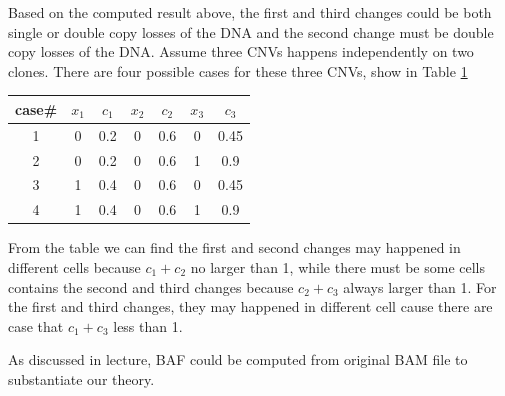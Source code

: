 \documentclass[a4paper]{article}
\begin{document}
Based on the computed result above, the first and third changes could be both single or double copy losses of the DNA and the second change must be double copy losses of the DNA. Assume three CNVs happens independently on two clones. There are four possible cases for these three CNVs, show in Table \ref{tb:1}

\begin{table}[h]
	\centering
	\begin{tabular}{c|cccccc}
		case\# & $x_1$ & $c_1$ & $x_2$ & $c_2$ & $x_3$ & $c_3$ \\
		\hline
		1 & 0 & 0.2 & 0 & 0.6 & 0 & 0.45 \\
		2 & 0 & 0.2 & 0 & 0.6 & 1 & 0.9 \\
		3 & 1 & 0.4 & 0 & 0.6 & 0 & 0.45 \\
		4 & 1 & 0.4 & 0 & 0.6 & 1 & 0.9 \\
	\end{tabular}
	\label{tb:1}
\end{table}

From the table we can find the first and second changes may happened in different cells because $c_1+c_2$ no larger than 1, while there must be some cells contains the second and third changes because $c_2+c_3$ always larger than 1. For the first and third changes, they may happened in different cell cause there are case that $c_1+c_3$ less than 1. 

As discussed in lecture, BAF could be computed from original BAM file to substantiate our theory. 
\end{document}
